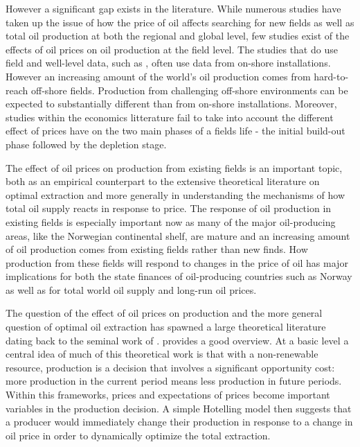 \documentclass[12pt]{article}
\begin{document}
However a significant gap exists in the literature.  While numerous studies have taken up the issue of how the price of oil affects searching for new fields as well as total oil production at both the regional and global level, few studies exist of the effects of oil prices on oil production at the field level.  The studies that do use field and well-level data, such as \citet{rao_taxation_2010}, often use data from on-shore installations.  However an increasing amount of the world's oil production comes from hard-to-reach off-shore fields.  Production from challenging off-shore environments can be expected to substantially different than from on-shore installations.  Moreover, studies within the economics litterature fail to take into account the different effect of prices have on the two main phases of a fields life - the initial build-out phase followed by the depletion stage.

The effect of oil prices on production from existing fields is an important topic, both as an empirical counterpart to the extensive theoretical literature on optimal extraction and more generally in understanding the mechanisms of how total oil supply reacts in response to price.  The response of oil production in existing fields is especially important now as many of the major oil-producing areas, like the Norwegian continental shelf, are mature and an increasing amount of oil production comes from existing fields rather than new finds.  How production from these fields will respond to changes in the price of oil has major implications for both the state finances of oil-producing countries such as Norway as well as for total world oil supply and long-run oil prices.  

The question of the effect of oil prices on production and the more general question of optimal oil extraction has spawned a large theoretical literature dating back to the seminal work of \citet{hotelling_economics_1931}. \citet{krautkraemer_nonrenewable_1998} provides a good overview. At a basic level a central idea of much of this theoretical work is that with a non-renewable resource, production is a decision that involves a significant opportunity cost: more production in the current period means less production in future periods.  Within this frameworks, prices and expectations of prices become important variables in the production decision. A simple Hotelling model then suggests that a producer would immediately change their production in response to a change in oil price in order to dynamically optimize the total extraction.
\end{document}

